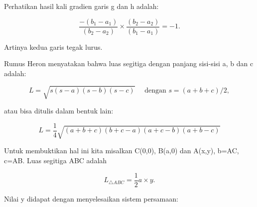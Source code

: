 \documentclass[a4paper,10pt]{article}
\begin{document}
\begin{eulernotebook}
\begin{eulercomment}
\begin{eulercomment}
\begin{eulercomment}
\begin{eulercomment}
\begin{eulercomment}
\begin{eulercomment}
\begin{eulercomment}
\begin{eulercomment}
\begin{eulercomment}
\begin{eulercomment}
\begin{eulercomment}
\begin{eulercomment}
\begin{eulercomment}
\begin{eulercomment}
\begin{eulercomment}
\begin{eulercomment}
\begin{eulercomment}
\begin{eulercomment}
\begin{eulercomment}
\begin{eulercomment}
\begin{eulercomment}
\begin{eulercomment}
\begin{eulercomment}
\begin{eulercomment}
\begin{eulercomment}
\begin{eulercomment}
\begin{eulercomment}
\begin{eulercomment}
\begin{eulercomment}
\begin{eulercomment}
\begin{eulercomment}
Perhatikan hasil kali gradien garis g dan h adalah:

\end{eulercomment}
\begin{eulerformula}
\[
\frac{-(b_1-a_1)}{(b_2-a_2)}\times \frac{(b_2-a_2)}{(b_1-a_1)} = -1.
\]
\end{eulerformula}
\begin{eulercomment}
Artinya kedua garis tegak lurus.
\end{eulercomment}
\begin{eulercomment}
Rumus Heron menyatakan bahwa luas segitiga dengan panjang sisi-sisi a,
b dan c adalah:

\end{eulercomment}
\begin{eulerformula}
\[
L = \sqrt{s(s-a)(s-b)(s-c)}\quad \text{ dengan } s=(a+b+c)/2,
\]
\end{eulerformula}
\begin{eulercomment}
atau bisa ditulis dalam bentuk lain:

\end{eulercomment}
\begin{eulerformula}
\[
L = \frac{1}{4}\sqrt{(a+b+c)(b+c-a)(a+c-b)(a+b-c)}
\]
\end{eulerformula}
\begin{eulercomment}
Untuk membuktikan hal ini kita misalkan C(0,0), B(a,0) dan A(x,y),
b=AC, c=AB. Luas segitiga ABC adalah

\end{eulercomment}
\begin{eulerformula}
\[
L_{\triangle ABC}=\frac{1}{2}a\times y.
\]
\end{eulerformula}
\begin{eulercomment}
Nilai y didapat dengan menyelesaikan sistem persamaan:


\end{eulercomment}
\end{eulercomment}
\end{eulercomment}
\end{eulercomment}
\end{eulercomment}
\end{eulercomment}
\end{eulercomment}
\end{eulercomment}
\end{eulercomment}
\end{eulercomment}
\end{eulercomment}
\end{eulercomment}
\end{eulercomment}
\end{eulercomment}
\end{eulercomment}
\end{eulercomment}
\end{eulercomment}
\end{eulercomment}
\end{eulercomment}
\end{eulercomment}
\end{eulercomment}
\end{eulercomment}
\end{eulercomment}
\end{eulercomment}
\end{eulercomment}
\end{eulercomment}
\end{eulercomment}
\end{eulercomment}
\end{eulercomment}
\end{eulercomment}
\end{eulercomment}
\end{eulernotebook}
\end{document}
